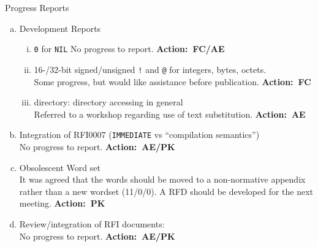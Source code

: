 \documentclass{article}
\makeatletter
\newcommand{\action}[1]{%
	\mbox{}\hfill \textbf{Action:~#1}%
}
\newcommand{\word}[1]{\texttt{#1}}
\renewcommand{\section}{\@startsection
	{section}{1}{0pt}{1pt}{1pt}
	{\normalfont\bfseries}
}
\makeatother
\begin{document}
%
%

\section{Progress Reports}
\label{reports}

\begin{enumerate}[a)]
\item Development Reports
	\begin{enumerate}[i)]
	\item \word{0} for \word{NIL}
		No progress to report.
		\action{FC/AE}

	\item 16-/32-bit signed/unsigned \word{!} and \word{@} for integers,
		bytes, octets. \\
		Some progress, but would like assistance before publication.
		\action{FC}

	\item \textsf{directory}: directory accessing in general \\
		Referred to a workshop regarding use of text substitution.
		\action{AE}
	\end{enumerate}

\item Integration of RFI0007 (\word{IMMEDIATE} vs ``compilation semantics'') \\
	No progress to report.
	\action{AE/PK}

\item Obsolescent Word set \\
	It was agreed that the words should be moved to a non-normative appendix
	rather than a new wordset (11/0/0).  A RFD should be developed for the
	next meeting.
	\action{PK}

\item Review/integration of RFI documents: \\
	No progress to report.
	\action{AE/PK}
\end{enumerate}
\end{document}
